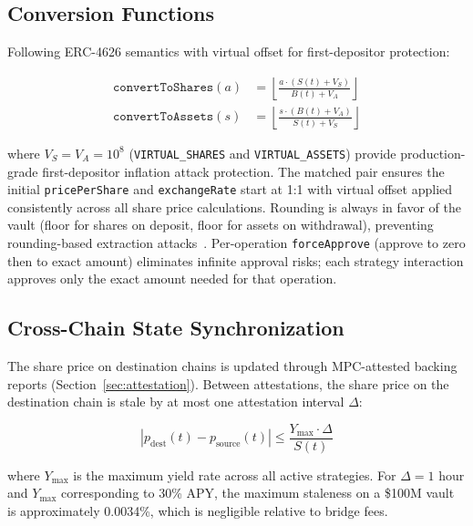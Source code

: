 \documentclass[11pt,twocolumn]{article}
\begin{document}
\subsection{Conversion Functions}

Following ERC-4626 semantics with virtual offset for first-depositor protection:

\begin{align}
  \texttt{convertToShares}(a) &= \left\lfloor \frac{a \cdot (S(t) + V_S)}{B(t) + V_A} \right\rfloor \label{eq:toShares}\\[4pt]
  \texttt{convertToAssets}(s) &= \left\lfloor \frac{s \cdot (B(t) + V_A)}{S(t) + V_S} \right\rfloor \label{eq:toAssets}
\end{align}

where $V_S = V_A = 10^8$ (\texttt{VIRTUAL\_SHARES} and \texttt{VIRTUAL\_ASSETS}) provide production-grade first-depositor inflation attack protection. The matched pair ensures the initial \texttt{pricePerShare} and \texttt{exchangeRate} start at 1:1 with virtual offset applied consistently across all share price calculations. Rounding is always in favor of the vault (floor for shares on deposit, floor for assets on withdrawal), preventing rounding-based extraction attacks~\cite{erc4626}. Per-operation \texttt{forceApprove} (approve to zero then to exact amount) eliminates infinite approval risks; each strategy interaction approves only the exact amount needed for that operation.

\subsection{Cross-Chain State Synchronization}

The share price on destination chains is updated through MPC-attested backing reports (Section~\ref{sec:attestation}). Between attestations, the share price on the destination chain is stale by at most one attestation interval $\Delta$:

\begin{equation}
  |p_{\text{dest}}(t) - p_{\text{source}}(t)| \leq \frac{Y_{\max} \cdot \Delta}{S(t)}
\end{equation}

where $Y_{\max}$ is the maximum yield rate across all active strategies. For $\Delta = 1$ hour and $Y_{\max}$ corresponding to 30\% APY, the maximum staleness on a \$100M vault is approximately 0.0034\%, which is negligible relative to bridge fees.

\end{document}
